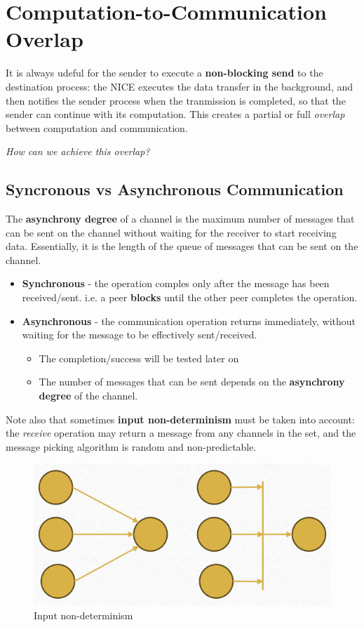 \section{Computation-to-Communication Overlap}

It is always udeful for the sender to execute a \textbf{non-blocking send} to the destination process: the NICE executes the data transfer in the background, and then notifies the sender process when the tranmission is completed, so that the sender can continue with its computation.
This creates a partial or full \textit{overlap} between computation and communication.

\textit{How can we achieve this overlap?}

\subsection{Syncronous vs Asynchronous Communication}

The \textbf{asynchrony degree} of a channel is the maximum number of messages that can be sent on the channel without waiting for the receiver to start receiving data.
Essentially, it is the length of the queue of messages that can be sent on the channel.

\begin{itemize}
   \item \textbf{Synchronous} - the operation comples only after the message has been received/sent. i.e. a peer \textbf{blocks} until the other peer completes the operation.
   \item \textbf{Asynchronous} - the communication operation returns immediately, without waiting for the message to be effectively sent/received.
   \begin{itemize}
      \item The completion/success will be tested later on
      \item The number of messages that can be sent depends on the \textbf{asynchrony degree} of the channel.
   \end{itemize}
\end{itemize}

Note also that sometimes \textbf{input non-determinism} must be taken into account:
the \textit{receive} operation may return a message from any channels in the set, and the message picking algorithm is random and non-predictable.

\begin{figure}[htbp]
   \centering
   \includegraphics{images/05/input_determism.png}
   \caption{Input non-determinism}
   \label{fig:05/input_determism}
\end{figure}

